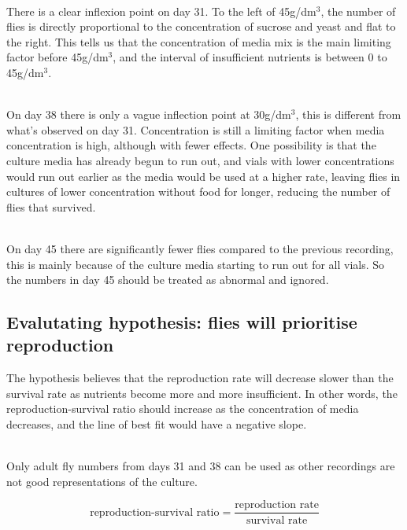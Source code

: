 \documentclass{article}
\begin{document}
\noindent\\
There is a clear inflexion point on day 31. To the left of 45g/dm$^3$, the number of flies is directly proportional to the concentration of sucrose and yeast and flat to the right. This tells us that the concentration of media mix is the main limiting factor before 45g/dm$^3$, and the interval of insufficient nutrients is between 0 to 45g/dm$^3$.

\noindent\\
On day 38 there is only a vague inflection point at 30g/dm$^3$, this is different from what's observed on day 31. Concentration is still a limiting factor when media concentration is high, although with fewer effects. One possibility is that the culture media has already begun to run out, and vials with lower concentrations would run out earlier as the media would be used at a higher rate, leaving flies in cultures of lower concentration without food for longer, reducing the number of flies that survived.

\noindent\\
On day 45 there are significantly fewer flies compared to the previous recording, this is mainly because of the culture media starting to run out for all vials. So the numbers in day 45 should be treated as abnormal and ignored.

\subsection{Evalutating hypothesis: flies will prioritise reproduction}

The hypothesis believes that the reproduction rate will decrease slower than the survival rate as nutrients become more and more insufficient. In other words, the reproduction-survival ratio should increase as the concentration of media decreases, and the line of best fit would have a negative slope.

\noindent\\
Only adult fly numbers from days 31 and 38 can be used as other recordings are not good representations of the culture.

$$\text{reproduction-survival ratio}=\frac{\text{reproduction rate}}{\text{survival rate}}$$
\end{document}

